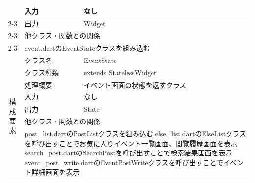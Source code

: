 \begin{table}[H]
\begin{tabular}{|c|l|l|}
                          & 入力                                                       & なし                                               \\ \cline{2-3}
                          & 出力                                                       & Widget                                           \\ \cline{2-3}
                          & \multicolumn{2}{l|}{他クラス・関数との関係}                                                                            \\ \cline{2-3}
                          & \multicolumn{2}{p{14cm}|}{event.dartのEventStateクラスを組み込む}                                                    \\ \hline
    \multirow{7}{*}{構成要素} & クラス名                                                     & EventState                                       \\ \cline{2-3}
                          & クラス種類                                                    & extends StatelessWidget                          \\ \cline{2-3}
                          & 処理概要                                                     & \multicolumn{1}{p{12cm}|}{イベント画面の状態を返すクラス}       \\ \cline{2-3}
                          & 入力                                                       & なし                                               \\ \cline{2-3}
                          & 出力                                                       & State                                            \\ \cline{2-3}
                          & \multicolumn{2}{l|}{他クラス・関数との関係}                                                                            \\ \cline{2-3}
                          & \multicolumn{2}{p{14cm}|}{
      post\_list.dartのPostListクラスを組み込む
      \newline else\_list.dartのElseListクラスを呼び出すことでお気に入りイベント一覧画面、閲覧履歴画面を表示
      \newline search\_post.dartのSearchPostを呼び出すことで検索結果画面を表示
    \newline event\_post\_write.dartのEventPostWriteクラスを呼び出すことでイベント詳細画面を表示}                                                              \\ \hline
  \end{tabular}
\end{table}

